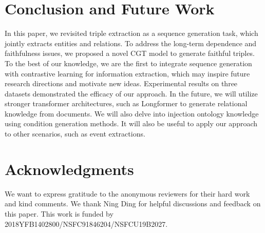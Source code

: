 \documentclass[letterpaper]{article} \usepackage{aaai21}  \usepackage{times}  \usepackage{helvet} \usepackage{courier}  \usepackage[hyphens]{url}  \usepackage{graphicx} \urlstyle{rm} \def\UrlFont{\rm}  \usepackage{natbib}  \usepackage[noend]{algpseudocode}
\begin{document}
\section{Conclusion and Future Work}
In this paper, we revisited triple extraction as a sequence generation task, which jointly extracts entities and relations. To address the long-term dependence and faithfulness issues, we proposed a novel CGT model to generate faithful triples. To the best of our knowledge, we are the first to integrate sequence generation with contrastive learning for information extraction, which may inspire future research directions and motivate new ideas. Experimental results on three datasets demonstrated the efficacy of our approach. In the future, we will utilize stronger transformer architectures, such as Longformer \cite{beltagy2020longformer} to generate relational knowledge from documents. We will also delve into injection ontology knowledge using condition generation methods. It will also be useful to apply our approach to other scenarios, such as event extractions. 

\section{Acknowledgments}
We  want to express gratitude to the anonymous reviewers for their hard work and kind comments. We thank Ning Ding for helpful discussions and feedback on this paper. This work is funded by 2018YFB1402800/NSFC91846204/NSFCU19B2027.


\end{document}
